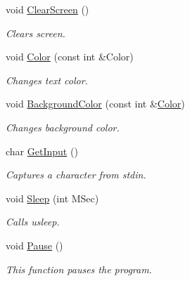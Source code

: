 \begin{DoxyCompactItemize}
void \hyperlink{namespace_chase_game_a3a7382465f6f23fe77cde4e589fb80d6}{Clear\-Screen} ()
\begin{DoxyCompactList}\small\item\em Clears screen. \end{DoxyCompactList}\item 
void \hyperlink{namespace_chase_game_a3a120300b1e200a26fe8680a33300283}{Color} (const int \&Color)
\begin{DoxyCompactList}\small\item\em Changes text color. \end{DoxyCompactList}\item 
void \hyperlink{namespace_chase_game_ad2dbfd93f4fd5725ab396d5dfa78a0c4}{Background\-Color} (const int \&\hyperlink{namespace_chase_game_a3a120300b1e200a26fe8680a33300283}{Color})
\begin{DoxyCompactList}\small\item\em Changes background color. \end{DoxyCompactList}\item 
char \hyperlink{namespace_chase_game_afa8eec677de5433e0e886da19f7e9c4a}{Get\-Input} ()
\begin{DoxyCompactList}\small\item\em Captures a character from stdin. \end{DoxyCompactList}\item 
void \hyperlink{namespace_chase_game_a8ca147721cdfaf96ee1f9c5007c27142}{Sleep} (int M\-Sec)
\begin{DoxyCompactList}\small\item\em Calls usleep. \end{DoxyCompactList}\item 
void \hyperlink{namespace_chase_game_aaaedf9429ec62c336f4324d580eec51c}{Pause} ()
\begin{DoxyCompactList}\small\item\em This function pauses the program. \end{DoxyCompactList}\end{DoxyCompactItemize}
